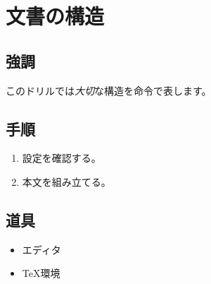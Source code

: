 \documentclass{jlreq}
\begin{document}
\section{文書の構造}

\subsection{強調}
このドリルでは\emph{大切}な構造を命令で表します。

\subsection{手順}
\begin{enumerate}
  \item 設定を確認する。
  \item 本文を組み立てる。
\end{enumerate}

\subsection{道具}
\begin{itemize}
  \item エディタ
  \item TeX環境
\end{itemize}
\end{document}
